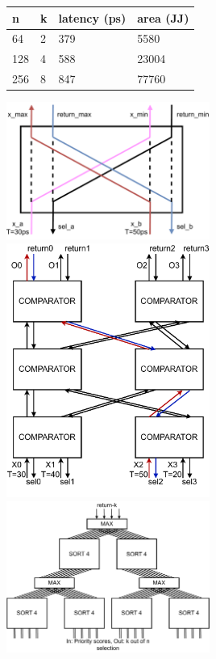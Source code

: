 \documentclass[conference]{IEEEtran}
\begin{document}

\begin{table}[]
\begin{tabular}{|l|l|l|l|}
\hline
n   & k & latency (ps) & area (JJ) \\ \hline
64  & 2 & 379          & 5580      \\ \hline
128 & 4 & 588          & 23004     \\ \hline
256 & 8 & 847          & 77760     \\ \hline
\end{tabular}
\end{table}

\includegraphics*[width=0.5\textwidth]{figures/comparator.drawio.pdf}
\includegraphics*[width=0.5\textwidth]{figures/sort4.drawio.pdf}
\includegraphics*[width=0.5\textwidth]{figures/arbiterk4n16.drawio.pdf}
\end{document}
